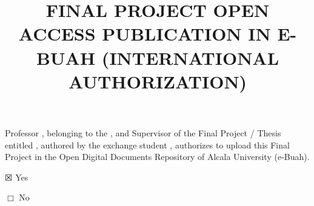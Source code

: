 \documentclass[12pt,a4paper,oneside]{article}
\title{FINAL PROJECT OPEN ACCESS PUBLICATION IN E-BUAH (INTERNATIONAL AUTHORIZATION)}             %
\date{}                                            %
\begin{document}

{\large
\maketitle 

\thispagestyle{empty}


Professor \myAcademicTutorFullName, belonging to the \myAcademicTutorForeignUniversity, and Supervisor of the Final Project / Thesis entitled \textit{\myBookTitleEnglish{}}, authored by the exchange student \myAuthorFullName{}, authorizes to upload this Final Project in the Open Digital Documents Repository of Alcala University (e-Buah).

\vspace{0.5cm}

$\XBox$ Yes

\vspace{0.5cm}

$\Box$ No


{}

\vspace{2cm}


}
\end{document}
